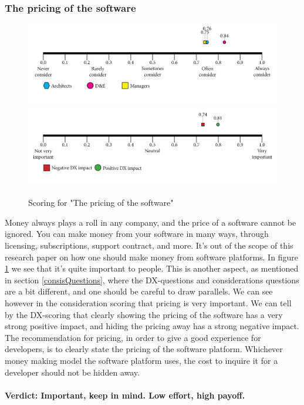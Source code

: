 \documentclass{article}
\begin{document}
\subsubsection{The pricing of the software}
\begin{figure}[H]
\centering
\includegraphics[width=\linewidth]{scorelines/aspect9.png}
\includegraphics[width=\linewidth]{dxscorelines/dxaspect9.png}
\caption{Scoring for "The pricing of the software"}
\label{fig:aspect9}
\end{figure}
Money always plays a roll in any company, and the price of a software cannot be ignored. You can make money from your software in many ways, through licensing, subscriptions, support contract, and more. It's out of the scope of this research paper on how one should make money from software platforms. In figure \ref{fig:aspect9} we see that it's quite important to people. This is another aspect, as mentioned in section \ref{consisQuestions}, where the DX-questions and considerations questions are a bit different, and one should be careful to draw parallels. We can see however in the consideration scoring that pricing is very important. We can tell by the DX-scoring that clearly showing the pricing of the software has a very strong positive impact, and hiding the pricing away has a strong negative impact. The recommendation for pricing, in order to give a good experience for developers, is to clearly state the pricing of the software platform. Whichever money making model the software platform uses, the cost to inquire it for a developer should not be hidden away. \\ \\
\textbf{Verdict: Important, keep in mind. Low effort, high payoff.}
\end{document}

